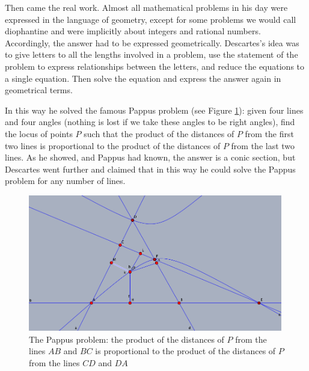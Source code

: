 Then came the real work. Almost all mathematical problems in his day were expressed in the language of geometry, except for some problems we would call diophantine and were implicitly about integers and rational numbers. Accordingly, the answer had to be expressed geometrically. Descartes's idea was to give letters to all the lengths involved in a problem, use the statement of the problem to express relationships between the letters, and reduce the equations to a single equation. Then solve the equation and express the answer again in geometrical terms.  

 In this way he solved the famous Pappus problem (see Figure \ref{figPappusproblem}): given four lines and four angles (nothing is lost if we take these angles to be right angles), find the locus of points $P$ such that the product of the distances of $P$ from the first two lines is proportional to the product of the distances of $P$ from the last two lines. As he showed, and Pappus had known, the answer is a conic section, but  Descartes went further and claimed that in this way he could solve the Pappus problem for any number of lines. 
 
 \bigskip
\begin{center}
    \begin{figure}
   \begin{center}  \includegraphics[width=30em]{Pappusproblem.png} 
   \end{center}
     \protect \caption{The Pappus problem: the product of the distances of $P$ from the lines $AB$ and $BC$ is proportional to the product of the distances of $P$ from the lines $CD$ and $DA$}
      \label{figPappusproblem}
     \end{figure}
\end{center}

\bigskip 


